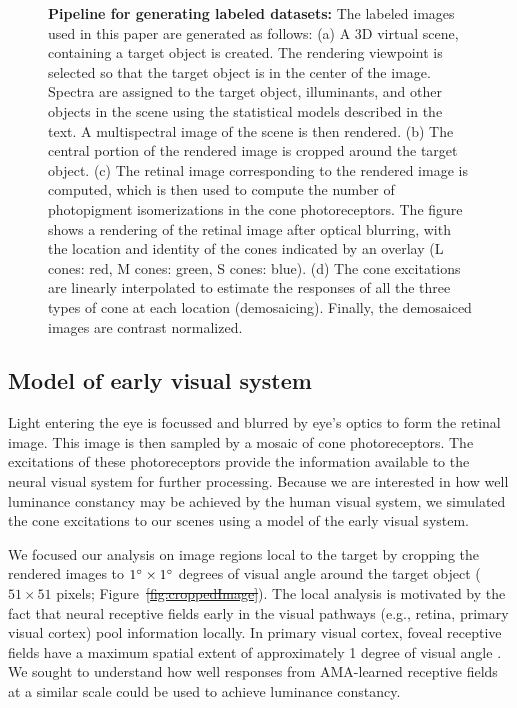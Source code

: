 \documentclass{jov}
\providecommand{\DIFaddtex}[1]{{\protect\color{blue}\uwave{#1}}} %
\providecommand{\DIFdeltex}[1]{{\protect\color{red}\sout{#1}}}                      %
\providecommand{\DIFaddbegin}{} %
\providecommand{\DIFaddend}{} %
\providecommand{\DIFdelbegin}{} %
\providecommand{\DIFdelend}{} %
\providecommand{\DIFaddbeginFL}{} %
\providecommand{\DIFaddendFL}{} %
\providecommand{\DIFadd}[1]{\texorpdfstring{\DIFaddtex{#1}}{#1}} %
\providecommand{\DIFdel}[1]{\texorpdfstring{\DIFdeltex{#1}}{}} %
\newcommand{\DIFscaledelfig}{0.5}
\newlength{\DIFdelgraphicswidth} %
\newlength{\DIFdelgraphicsheight} %
\newcommand{\DIFaddincludegraphics}[2][]{{\color{blue}\fbox{\DIFOincludegraphics[#1]{#2}}}} %
\newcommand{\DIFdelincludegraphics}[2][]{%
\sbox{\DIFdelgraphicsbox}{\DIFOincludegraphics[#1]{#2}}%
\settoboxwidth{\DIFdelgraphicswidth}{\DIFdelgraphicsbox} %
\settoboxtotalheight{\DIFdelgraphicsheight}{\DIFdelgraphicsbox} %
\scalebox{\DIFscaledelfig}{%
\parbox[b]{\DIFdelgraphicswidth}{\usebox{\DIFdelgraphicsbox}\\[-\baselineskip] \rule{\DIFdelgraphicswidth}{0em}}\llap{\resizebox{\DIFdelgraphicswidth}{\DIFdelgraphicsheight}{%
\setlength{\unitlength}{\DIFdelgraphicswidth}%
\begin{picture}(1,1)%
\thicklines\linethickness{2pt} %
{\color[rgb]{1,0,0}\put(0,0){\framebox(1,1){}}}%
{\color[rgb]{1,0,0}\put(0,0){\line( 1,1){1}}}%
{\color[rgb]{1,0,0}\put(0,1){\line(1,-1){1}}}%
\end{picture}%
}\hspace*{3pt}}} %
} %
\DeclareRobustCommand{\DIFaddbegin}{\DIFOaddbegin \let\includegraphics\DIFaddincludegraphics} %
\DeclareRobustCommand{\DIFaddend}{\DIFOaddend \let\includegraphics\DIFOincludegraphics} %
\DeclareRobustCommand{\DIFdelbegin}{\DIFOdelbegin \let\includegraphics\DIFdelincludegraphics} %
\DeclareRobustCommand{\DIFdelend}{\DIFOaddend \let\includegraphics\DIFOincludegraphics} %
\DeclareRobustCommand{\DIFaddbeginFL}{\DIFOaddbeginFL \let\includegraphics\DIFaddincludegraphics} %
\DeclareRobustCommand{\DIFaddendFL}{\DIFOaddendFL \let\includegraphics\DIFOincludegraphics} %
\begin{document}
\begin{figure}
    \caption{{\bf Pipeline for generating labeled datasets:}  The labeled images used in this paper are generated as follows: (a) A 3D virtual scene, containing a target object is created. The rendering viewpoint is selected so that the target object is in the center of the image. Spectra are assigned to the target object, illuminants, and other objects in the scene using the statistical models described in the text. A multispectral image of the scene is then rendered. (b) The central portion of the rendered image is cropped around the target object. (c) The retinal image corresponding to the rendered image is computed, which is then used to compute the number of photopigment isomerizations in the cone photoreceptors. The figure shows a rendering of the retinal image after optical blurring, with the location and identity of the cones indicated by an overlay (L cones: red, M cones: green, S cones: blue).  (d) The cone excitations are linearly interpolated to estimate the responses of all the three types of cone at each location (demosaicing). Finally, the demosaiced images are contrast normalized.}
\DIFaddbeginFL \label{fig:figure9}
\DIFaddendFL \end{figure}

\subsection{Model of early visual system} \label{method:Isetbio}
Light entering the eye is focussed and blurred by eye's optics to form the retinal image.
This image is then sampled by a mosaic of cone photoreceptors.
The excitations of these photoreceptors provide the information available to the neural visual system for further processing.
Because we are interested in how well luminance constancy may be achieved by the human visual system, we simulated the cone excitations
to our scenes using a model of the early visual system.

We focused our analysis on image regions local to the target by cropping the rendered images to $1\degree \times 1\degree$ degrees of visual angle around the target object ($51 \times 51$ pixels; Figure~\DIFdelbegin \DIFdel{\ref{fig:croppedImage}}\DIFdelend \DIFaddbegin \DIFadd{\ref{fig:figure9}b}\DIFaddend ).
The local analysis is motivated by the fact that neural receptive fields early in the visual pathways (e.g., retina, primary visual cortex) pool information locally. 
In primary visual cortex, foveal receptive fields have a maximum spatial extent of approximately 1 degree of visual angle \cite{gattass1981visual, gattass1988visuotopic}. 
We sought to understand how well responses from AMA-learned receptive fields at a similar scale could be used to achieve luminance constancy.
\end{document}
